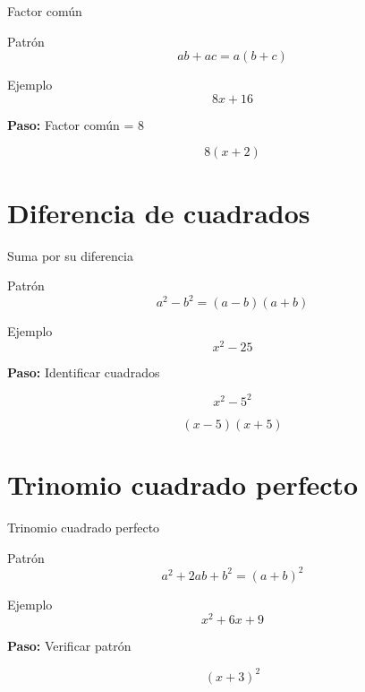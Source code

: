 \documentclass[aspectratio=169,12pt]{beamer}
\newcommand{\Paso}[1]{
	\textbf{Paso:} #1
}
\begin{document}
	\begin{frame}{Factor común}
		
		\begin{block}{Patrón}
			\[
			ab + ac = a(b+c)
			\]
		\end{block}
		
		\pause
		
		\begin{block}{Ejemplo}
			\[
			8x + 16
			\]
			
			\pause
			\Paso{Factor común = 8}
			
			\pause
			\[
			8(x+2)
			\]
			
		\end{block}
		
	\end{frame}
	
	\section{Diferencia de cuadrados}
	
	\begin{frame}{Suma por su diferencia}
		
		\begin{block}{Patrón}
			\[
			a^2 - b^2 = (a-b)(a+b)
			\]
		\end{block}
		
		\pause
		
		\begin{block}{Ejemplo}
			\[
			x^2 - 25
			\]
			
			\pause
			\Paso{Identificar cuadrados}
			\[
			x^2 - 5^2
			\]
			
			\pause
			\[
			(x-5)(x+5)
			\]
			
		\end{block}
		
	\end{frame}
	
	\section{Trinomio cuadrado perfecto}
	
	\begin{frame}{Trinomio cuadrado perfecto}
		
		\begin{block}{Patrón}
			\[
			a^2 + 2ab + b^2 = (a+b)^2
			\]
		\end{block}
		
		\pause
		
		\begin{block}{Ejemplo}
			\[
			x^2 + 6x + 9
			\]
			
			\pause
			\Paso{Verificar patrón}
			
			\pause
			\[
			(x+3)^2
			\]
			
		\end{block}
		
	\end{frame}
	
\end{document}
